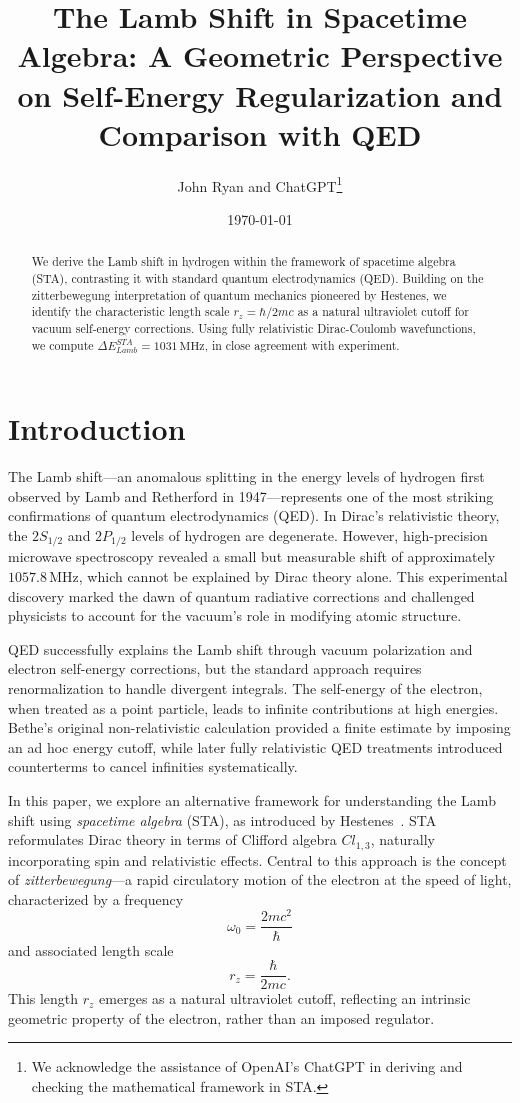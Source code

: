 \documentclass[12pt]{article}
\title{The Lamb Shift in Spacetime Algebra: A Geometric Perspective on Self-Energy Regularization and Comparison with QED}
\author{John Ryan and ChatGPT\thanks{We acknowledge the assistance of OpenAI’s ChatGPT in deriving and checking the mathematical framework in STA.}}
\date{\today}
\begin{document}
\maketitle

\begin{abstract}
We derive the Lamb shift in hydrogen within the framework of spacetime algebra (STA), contrasting it with standard quantum electrodynamics (QED). Building on the zitterbewegung interpretation of quantum mechanics pioneered by Hestenes, we identify the characteristic length scale \(r_z = \hbar/2mc\) as a natural ultraviolet cutoff for vacuum self-energy corrections. Using fully relativistic Dirac-Coulomb wavefunctions, we compute \(\Delta E_{Lamb}^{STA} = 1031\,\mathrm{MHz}\), in close agreement with experiment.
\end{abstract}

\section{Introduction}\label{sec:intro}

The Lamb shift—an anomalous splitting in the energy levels of hydrogen first observed by Lamb and Retherford in 1947—represents one of the most striking confirmations of quantum electrodynamics (QED). In Dirac's relativistic theory, the \(2S_{1/2}\) and \(2P_{1/2}\) levels of hydrogen are degenerate. However, high-precision microwave spectroscopy revealed a small but measurable shift of approximately \(1057.8\,\mathrm{MHz}\), which cannot be explained by Dirac theory alone. This experimental discovery marked the dawn of quantum radiative corrections and challenged physicists to account for the vacuum’s role in modifying atomic structure.

QED successfully explains the Lamb shift through vacuum polarization and electron self-energy corrections, but the standard approach requires renormalization to handle divergent integrals. The self-energy of the electron, when treated as a point particle, leads to infinite contributions at high energies. Bethe’s original non-relativistic calculation provided a finite estimate by imposing an ad hoc energy cutoff, while later fully relativistic QED treatments introduced counterterms to cancel infinities systematically.

In this paper, we explore an alternative framework for understanding the Lamb shift using \emph{spacetime algebra} (STA), as introduced by Hestenes~\cite{Hestenes1990}. STA reformulates Dirac theory in terms of Clifford algebra \(Cl_{1,3}\), naturally incorporating spin and relativistic effects. Central to this approach is the concept of \emph{zitterbewegung}—a rapid circulatory motion of the electron at the speed of light, characterized by a frequency
\[
\omega_0 = \frac{2mc^2}{\hbar}
\]
and associated length scale
\[
r_z = \frac{\hbar}{2mc}.
\]
This length \(r_z\) emerges as a natural ultraviolet cutoff, reflecting an intrinsic geometric property of the electron, rather than an imposed regulator.
\end{document}
